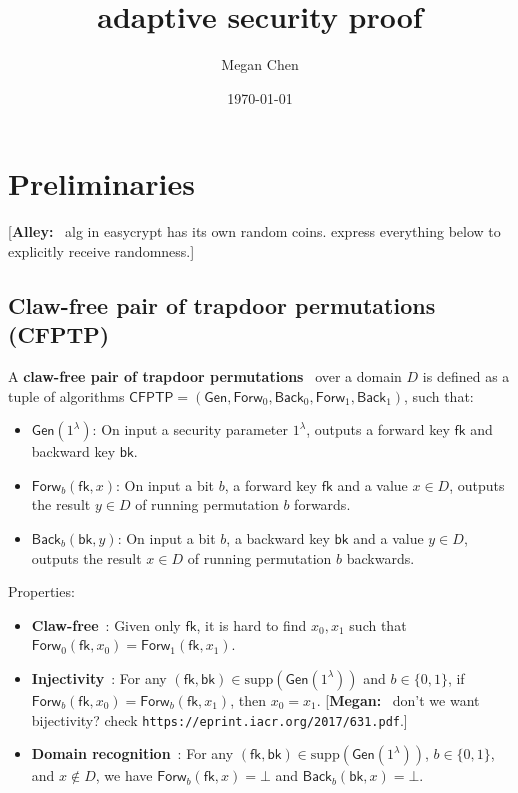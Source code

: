 \documentclass[11pt,letterpaper]{article}
\title{\cite{CanettiF01} adaptive security proof}
\author{Megan Chen}
\date{\today}
\renewcommand{\emph}[1]{\textbf{#1}~}
\newcommand{\doclearpage}{%
  \iffull\clearpage\else\fi
}
\newcommand{\authnote}[2]{[{\color{red}\textbf{#1:}}~{\color{blue} #2}]}
\newcommand{\authnote}[2]{}
\newcommand{\alley}[1]{\authnote{Alley}{#1}}
\newcommand{\megan}[1]{\authnote{Megan}{#1}}
\theoremstyle{plain} %
\theoremstyle{definition} %
\theoremstyle{remark} %
\newcommand{\code}[1]{\texttt{#1}} %
\newcommand{\supp}{\textrm{supp}} %
\newcommand{\Input}{x}
\newcommand{\SecParam}{\lambda}
\newcommand{\Gen}{\mathsf{Gen}}
\newcommand{\CFPTP}{\mathsf{CFPTP}}
\newcommand{\Forw}{\mathsf{Forw}}
\newcommand{\Back}{\mathsf{Back}}
\newcommand{\ForwKey}{\mathsf{fk}}
\newcommand{\BackKey}{\mathsf{bk}}
\newcommand{\Domain}{D}
\newcommand{\CFPTPInput}{\Input}
\newcommand{\Output}{y}
\newcommand{\CFPTPBit}{b}
\newcommand{\Bits}{\{0,1\}}
\begin{document}
\maketitle
\tableofcontents

\doclearpage
\section{Preliminaries}
\label{sec:preliminaries}

\alley{alg in easycrypt has its own random coins. express everything below to explicitly receive randomness.}
\subsection{Claw-free pair of trapdoor permutations (CFPTP)}
A \emph{claw-free pair of trapdoor permutations} over a domain $\Domain$ is defined as a tuple of algorithms $\CFPTP = (\Gen, \Forw_0, \Back_0, \Forw_1, \Back_1)$, such that:
\begin{itemize}
	\item $\Gen(1^\SecParam)$: On input a security parameter $1^\SecParam$, outputs a forward key $\ForwKey$ and backward key $\BackKey$.
	\item $\Forw_{\CFPTPBit}(\ForwKey, \CFPTPInput)$: On input a bit $\CFPTPBit$, a forward key $\ForwKey$ and a value $\Input \in \Domain$, outputs the result $\Output \in \Domain$ of running permutation $\CFPTPBit$ forwards.
	\item $\Back_{\CFPTPBit}(\BackKey, \Output)$: On input a bit $\CFPTPBit$, a backward key $\BackKey$ and a value $\Output \in \Domain$, outputs the result $\Input \in \Domain$ of running permutation $b$ backwards.
\end{itemize}

Properties:
\begin{itemize}
    \item \emph{Claw-free}: Given only $\ForwKey$, it is hard to find $\CFPTPInput_0, \CFPTPInput_1$ such that $\Forw_{0}(\ForwKey,\CFPTPInput_0) = \Forw_{1}(\ForwKey,\CFPTPInput_1)$.

    \item \emph{Injectivity}: For any $(\ForwKey, \BackKey) \in \supp(\Gen(1^\SecParam))$ and $\CFPTPBit \in \Bits$, if $\Forw_{\CFPTPBit}(\ForwKey,\CFPTPInput_0) = \Forw_{\CFPTPBit}(\ForwKey,\CFPTPInput_1)$, then $\CFPTPInput_0 = \CFPTPInput_1$. \megan{don't we want bijectivity? check \code{https://eprint.iacr.org/2017/631.pdf}.}

    \item \emph{Domain recognition}: For any $(\ForwKey, \BackKey) \in \supp(\Gen(1^\SecParam))$, $\CFPTPBit \in \Bits$, and $\CFPTPInput \not\in \Domain$, we have $\Forw_{\CFPTPBit}(\ForwKey,\CFPTPInput) = \bot$ and $\Back_{\CFPTPBit}(\BackKey,\CFPTPInput) = \bot$.
\end{itemize}
\end{document}

